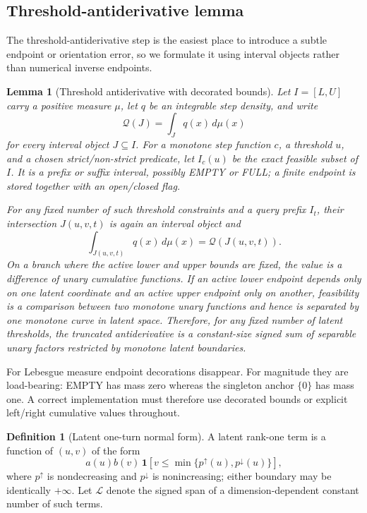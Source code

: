 \documentclass[12pt,a4paper]{article}
\newtheorem{lemma}[theorem]{Lemma}
\theoremstyle{definition}
\newtheorem{definition}[theorem]{Definition}
\newcommand{\1}{\mathbf 1}
\begin{document}
\subsection{Threshold-antiderivative lemma}

The threshold-antiderivative step is the easiest place to introduce a subtle endpoint or orientation error, so we formulate it using interval objects rather than numerical inverse endpoints.

\begin{lemma}[Threshold antiderivative with decorated bounds]   \label{lem:threshold}
Let $I=[L,U]$ carry a positive measure $\mu$, let $q$ be an integrable step density, and write
\[
\mathcal Q(J)=\int_Jq(x)\,d\mu(x)
\]
for every interval object $J\subseteq I$.  For a monotone step function $c$, a threshold $u$, and a chosen strict/non-strict predicate, let $I_c(u)$ be the exact feasible subset of $I$.  It is a prefix or suffix interval, possibly EMPTY or FULL; a finite endpoint is stored together with an open/closed flag.

For any fixed number of such threshold constraints and a query prefix $I_t$, their intersection $J(u,v,t)$ is again an interval object and
\begin{equation}
\boxed{\int_{J(u,v,t)}q(x)\,d\mu(x)=\mathcal Q(J(u,v,t)).}      \label{eq:intervalthreshold}
\end{equation}
On a branch where the active lower and upper bounds are fixed, the value is a difference of unary cumulative functions.  If an active lower endpoint depends only on one latent coordinate and an active upper endpoint only on another, feasibility is a comparison between two monotone unary functions and hence is separated by one monotone curve in latent space.  Therefore, for any fixed number of latent thresholds, the truncated antiderivative is a constant-size signed sum of separable unary factors restricted by monotone latent boundaries.
\end{lemma}

For Lebesgue measure endpoint decorations disappear.  For magnitude they are load-bearing: EMPTY has mass zero whereas the singleton anchor $\{0\}$ has mass one.  A correct implementation must therefore use decorated bounds or explicit left/right cumulative values throughout.

\begin{definition}[Latent one-turn normal form]                  \label{def:latent}
A latent rank-one term is a function of $(u,v)$ of the form
\begin{equation}
a(u)b(v)\,\1[v\le \min\{p^\uparrow(u),p^\downarrow(u)\}],     \label{eq:latentterm}
\end{equation}
where $p^\uparrow$ is nondecreasing and $p^\downarrow$ is nonincreasing; either boundary may be identically $+\infty$. Let $\mathcal L$ denote the signed span of a dimension-dependent constant number of such terms.
\end{definition}
\end{document}
